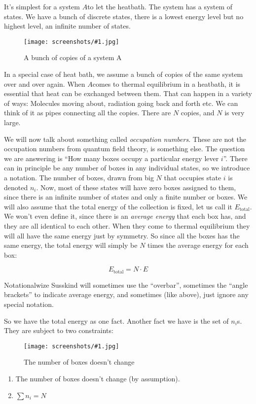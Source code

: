 \documentclass[a4, 12pt, english, USenglish]{scrreprt}
\newcommand{\screenshot}[2]{
\begin{figure}[htb]
\texttt{[image: screenshots/\#1.jpg]}
\label{#1}
\caption{#2}
\end{figure}}
\newcommand{\idx}[1]{{\em #1}\index{#1}}
\begin{document}
It's simplest for a system \(A\)to let the heatbath.  The system has
a system of states.   We have a bunch of discrete states, there is a
lowest energy level but no highest level, an infinite number of
states.


\screenshot{energystates2}{A bunch of copies of a system A}
In a special case of heat bath, we assume a bunch of copies of the
same system over and over again.  When \(A\)comes to thermal
equilibrium in a heatbath, it is essential that heat can be exchanged
between them.  That can happen in a variety of ways: Molecules moving
about, radiation going back and forth etc.  We can think of it as
pipes connecting all the copies.  There are \(N\) copies, and \(N\) is
very large.    

We will now talk about something called \idx{occupation numbers}.
These are not the occupation numbers from quantum field theory,  is
something else.   The question we are answering is ``How many boxes
occupy a particular energy lever \(i\)''.   There can in principle be
any number of boxes in any individual states, so we introduce a
notation.  The number of boxes, drawn from big \(N\) that occupies
state \(i\) is denoted \(n_i\).   Now, most of these states will have
zero boxes assigned to them, since there is an infinite number of
states and only a finite number or boxes.  We will also assume that
the total energy of the collection is fixed, let us call it
\(E_{\mbox{total}}\).  We won't even define it, since there is an
\idx{average energy} that  each box has, and they are all identical to
each other.  When they come to thermal equilibrium they will all have
the same energy just by symmetry.  So since all the boxes has the same
energy, the total energy will simply be \(N\) times the average energy
for each box:

\[
E_{\mbox{total}}= N \cdot E
\]

Notationalwize Susskind will sometimes use the ``overbar'', sometimes
the ``angle brackets'' to indicate average energy, and sometimes (like
above), just ignore any special notation.

So we have the total energy as one fact.  Another fact we have is the
set of \(n_i\)s. They are subject to two constraints:

\screenshot{sumboxes}{The number of boxes doesn't change}

\begin{enumerate}
\item The number of boxes doesn't change (by assumption).
\item \(\sum n_i = N\)
\end{enumerate}
\end{document}
